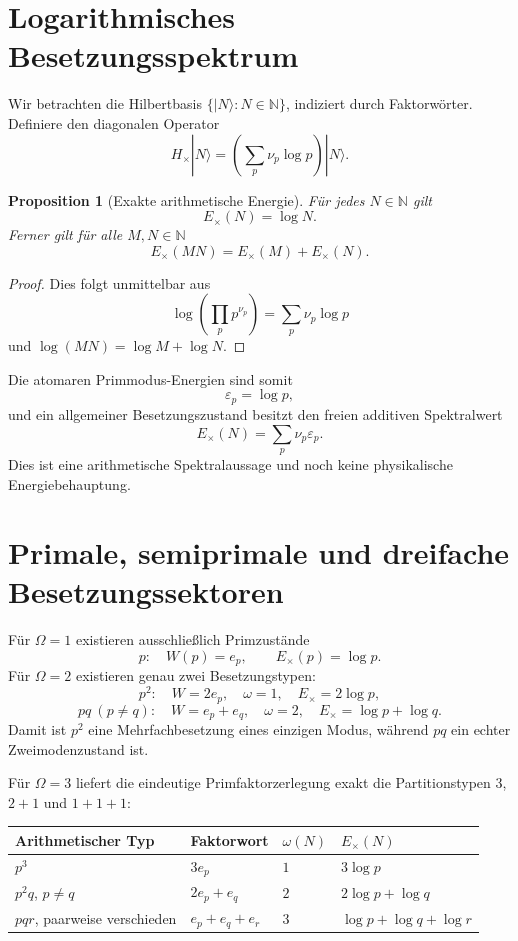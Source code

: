 \documentclass[11pt,a4paper]{article}
\newtheorem{proposition}[theorem]{Proposition}
\theoremstyle{definition}
\theoremstyle{remark}
\newcommand{\NN}{\mathbb N}
\begin{document}
\section{Logarithmisches Besetzungsspektrum}
Wir betrachten die Hilbertbasis $\{|N\rangle:N\in\NN\}$, indiziert durch Faktorwörter. Definiere den diagonalen Operator
\begin{equation}
H_\times|N\rangle
=\left(\sum_p\nu_p\log p\right)|N\rangle.
\end{equation}

\begin{proposition}[Exakte arithmetische Energie]
Für jedes $N\in\NN$ gilt
\[
E_\times(N)=\log N.
\]
Ferner gilt für alle $M,N\in\NN$
\[
E_\times(MN)=E_\times(M)+E_\times(N).
\]
\end{proposition}

\begin{proof}
Dies folgt unmittelbar aus
\[
\log\left(\prod_pp^{\nu_p}\right)=\sum_p\nu_p\log p
\]
und $\log(MN)=\log M+\log N$.
\end{proof}

Die atomaren Primmodus-Energien sind somit
\[
\varepsilon_p=\log p,
\]
und ein allgemeiner Besetzungszustand besitzt den freien additiven Spektralwert
\[
E_\times(N)=\sum_p\nu_p\varepsilon_p.
\]
Dies ist eine arithmetische Spektralaussage und noch keine physikalische Energiebehauptung.

\section{Primale, semiprimale und dreifache Besetzungssektoren}
Für $\Omega=1$ existieren ausschließlich Primzustände
\[
p:\quad W(p)=e_p,\qquad E_\times(p)=\log p.
\]
Für $\Omega=2$ existieren genau zwei Besetzungstypen:
\[
p^2:\quad W=2e_p,\quad \omega=1,\quad E_\times=2\log p,
\]
\[
pq\ (p\ne q):\quad W=e_p+e_q,\quad \omega=2,\quad E_\times=\log p+\log q.
\]
Damit ist $p^2$ eine Mehrfachbesetzung eines einzigen Modus, während $pq$ ein echter Zweimodenzustand ist.

Für $\Omega=3$ liefert die eindeutige Primfaktorzerlegung exakt die Partitionstypen $3$, $2+1$ und $1+1+1$:
\begin{center}
\begin{tabular}{@{}llll@{}}
\toprule
Arithmetischer Typ & Faktorwort & $\omega(N)$ & $E_\times(N)$ \\
\midrule
$p^3$ & $3e_p$ & $1$ & $3\log p$ \\
$p^2q$, $p\ne q$ & $2e_p+e_q$ & $2$ & $2\log p+\log q$ \\
$pqr$, paarweise verschieden & $e_p+e_q+e_r$ & $3$ & $\log p+\log q+\log r$ \\
\bottomrule
\end{tabular}
\end{center}
\end{document}
